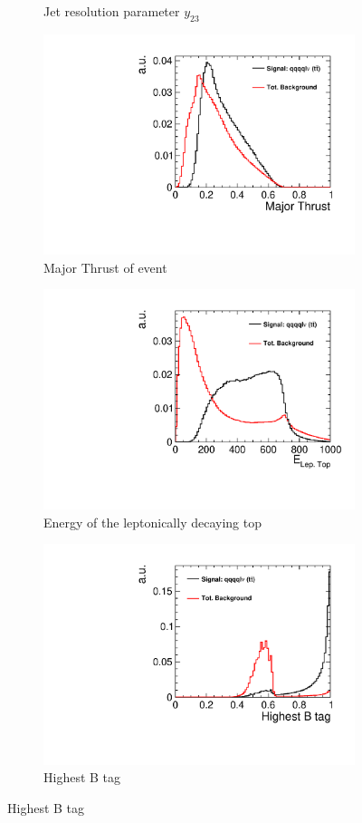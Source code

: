 \begin{figure}[]
\begin{subfigure}[b]{0.5\linewidth}
    \caption{Jet resolution parameter $y_{23}$} 
    \vspace{4ex}
  \end{subfigure}%
  \begin{subfigure}[b]{0.5\linewidth}
    \centering
    \includegraphics[width=0.75\linewidth]{TopAnalysis/figures/BDTVariables/majthval.pdf} 
    \caption{Major Thrust of event} 
    \vspace{4ex}
  \end{subfigure}
  \begin{subfigure}[b]{0.5\linewidth}
    \centering
    \includegraphics[width=0.75\linewidth]{TopAnalysis/figures/BDTVariables/LeptonicTopEnergy.pdf} 
    \caption{Energy of the leptonically decaying top} 
    \vspace{4ex}
  \end{subfigure}%
    \begin{subfigure}[b]{0.5\linewidth}
    \centering
    \includegraphics[width=0.75\linewidth]{TopAnalysis/figures/BDTVariables/HighestBTag.pdf} 
    \caption{Highest B tag} 
    \vspace{4ex}
  \end{subfigure}
\end{figure}

